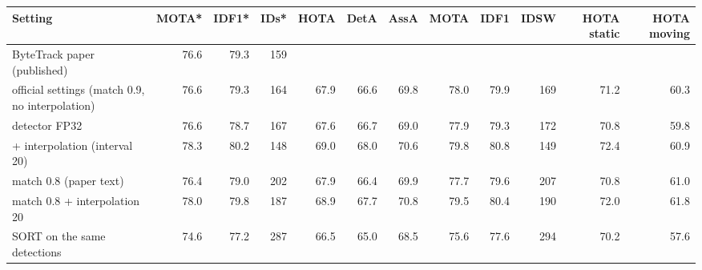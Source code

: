 \begin{tabular}{lrrrrrrrrrrr}
\toprule
Setting & MOTA* & IDF1* & IDs* & HOTA & DetA & AssA & MOTA & IDF1 & IDSW & HOTA static & HOTA moving \\
\midrule
ByteTrack paper (published) & 76.6 & 79.3 & 159 &  &  &  &  &  &  &  &  \\
official settings (match 0.9, no interpolation) & 76.6 & 79.3 & 164 & 67.9 & 66.6 & 69.8 & 78.0 & 79.9 & 169 & 71.2 & 60.3 \\
detector FP32 & 76.6 & 78.7 & 167 & 67.6 & 66.7 & 69.0 & 77.9 & 79.3 & 172 & 70.8 & 59.8 \\
+ interpolation (interval 20) & 78.3 & 80.2 & 148 & 69.0 & 68.0 & 70.6 & 79.8 & 80.8 & 149 & 72.4 & 60.9 \\
match 0.8 (paper text) & 76.4 & 79.0 & 202 & 67.9 & 66.4 & 69.9 & 77.7 & 79.6 & 207 & 70.8 & 61.0 \\
match 0.8 + interpolation 20 & 78.0 & 79.8 & 187 & 68.9 & 67.7 & 70.8 & 79.5 & 80.4 & 190 & 72.0 & 61.8 \\
SORT on the same detections & 74.6 & 77.2 & 287 & 66.5 & 65.0 & 68.5 & 75.6 & 77.6 & 294 & 70.2 & 57.6 \\
\bottomrule
\end{tabular}
